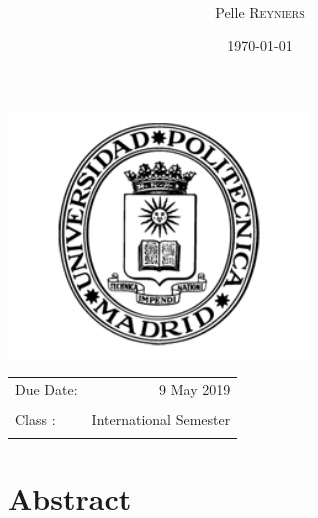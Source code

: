 \documentclass[twoside,a4paper]{article}
\title{\maintitle \\ \course \\{\small\ \coursenumber}} %
\author{Pelle \textsc{Reyniers} \\ } %
\date{\today} %
\newcommand{\class}{International Semester}
\begin{document}
    \sloppy %
    \begin{titlepage}
    \maketitle %
    
    \vfill
    \begin{center}
    \includegraphics[width=0.6\textwidth]{upm_logo.png} %
    \end{center}
    \vfill
    \vfill
    \vfill
    
    \begin{center}
    \begin{tabular}{l r}
    Due Date: & 9 May 2019 \\ %
    \\
    Class : & \class \\
    \\
    \end{tabular}
    \end{center}
    \vfill
    \vfill
    \end{titlepage}
    \clearpage
    
    
    
    \section*{Abstract}
    
    \newpage
\end{document}
